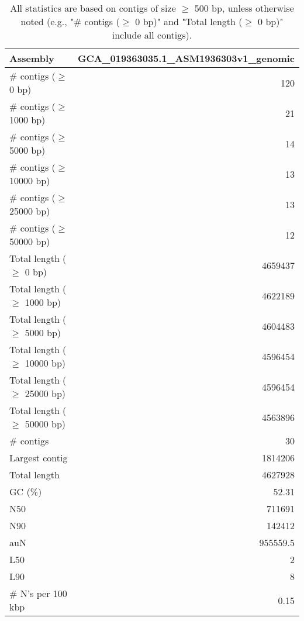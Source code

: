 \documentclass[12pt,a4paper]{article}
\begin{document}
\begin{table}[ht]
\begin{center}
\caption{All statistics are based on contigs of size $\geq$ 500 bp, unless otherwise noted (e.g., "\# contigs ($\geq$ 0 bp)" and "Total length ($\geq$ 0 bp)" include all contigs).}
\begin{tabular}{|l*{1}{|r}|}
\hline
Assembly & GCA\_019363035.1\_ASM1936303v1\_genomic \\ \hline
\# contigs ($\geq$ 0 bp) & 120 \\ \hline
\# contigs ($\geq$ 1000 bp) & 21 \\ \hline
\# contigs ($\geq$ 5000 bp) & 14 \\ \hline
\# contigs ($\geq$ 10000 bp) & 13 \\ \hline
\# contigs ($\geq$ 25000 bp) & 13 \\ \hline
\# contigs ($\geq$ 50000 bp) & 12 \\ \hline
Total length ($\geq$ 0 bp) & 4659437 \\ \hline
Total length ($\geq$ 1000 bp) & 4622189 \\ \hline
Total length ($\geq$ 5000 bp) & 4604483 \\ \hline
Total length ($\geq$ 10000 bp) & 4596454 \\ \hline
Total length ($\geq$ 25000 bp) & 4596454 \\ \hline
Total length ($\geq$ 50000 bp) & 4563896 \\ \hline
\# contigs & 30 \\ \hline
Largest contig & 1814206 \\ \hline
Total length & 4627928 \\ \hline
GC (\%) & 52.31 \\ \hline
N50 & 711691 \\ \hline
N90 & 142412 \\ \hline
auN & 955559.5 \\ \hline
L50 & 2 \\ \hline
L90 & 8 \\ \hline
\# N's per 100 kbp & 0.15 \\ \hline
\end{tabular}
\end{center}
\end{table}
\end{document}
